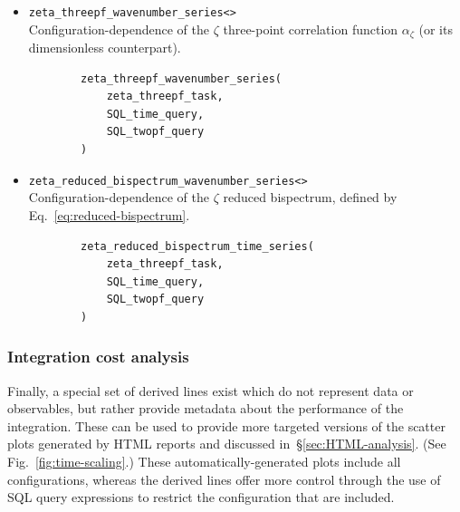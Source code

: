 \documentclass[11pt,a4paper]{article}
\begin{document}
\begin{itemize}
    \item \texttt{zeta_threepf_wavenumber_series<>} \\
    Configuration-dependence
    of the $\zeta$ three-point correlation function $\alpha_\zeta$
    (or its dimensionless counterpart).
    \begin{verbatim}
        zeta_threepf_wavenumber_series(    
            zeta_threepf_task,
            SQL_time_query,
            SQL_twopf_query
        )
    \end{verbatim}
    
    \item \texttt{zeta_reduced_bispectrum_wavenumber_series<>} \\
    Configuration-dependence of the $\zeta$ reduced bispectrum, defined by
    Eq.~\eqref{eq:reduced-bispectrum}.
    \begin{verbatim}
        zeta_reduced_bispectrum_time_series(    
            zeta_threepf_task,
            SQL_time_query,
            SQL_twopf_query
        )
    \end{verbatim}

\end{itemize}

\subsubsection{Integration cost analysis}

Finally, a special set of derived lines exist which do not represent
data or observables, but rather provide metadata about the
performance of the integration.
These can be used to provide more targeted versions of the
scatter plots generated by HTML reports
and discussed in~\S\ref{sec:HTML-analysis}.
(See Fig.~\ref{fig:time-scaling}.)
These automatically-generated plots include all configurations,
whereas the derived lines offer more control through the use of SQL
query expressions to restrict the configuration that are included.
\end{document}
